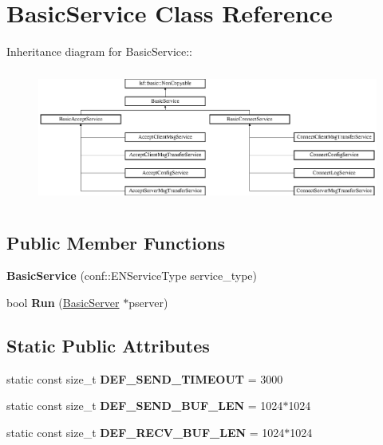 \hypertarget{classBasicService}{
\section{BasicService Class Reference}
\label{classBasicService}
}
Inheritance diagram for BasicService::\begin{figure}[H]
\begin{center}
\leavevmode
\includegraphics[height=4.41441cm]{classBasicService}
\end{center}
\end{figure}
\subsection*{Public Member Functions}
\begin{DoxyCompactItemize}
\item 
\hypertarget{classBasicService_aa4fdda73ce0c6d556456e02d8ed246ae}{
{\bfseries BasicService} (conf::ENServiceType service\_\-type)}
\label{classBasicService_aa4fdda73ce0c6d556456e02d8ed246ae}

\item 
\hypertarget{classBasicService_abcf9a9ffffb3ecfff2c16258cfde2d2f}{
bool {\bfseries Run} (\hyperlink{classBasicServer}{BasicServer} $\ast$pserver)}
\label{classBasicService_abcf9a9ffffb3ecfff2c16258cfde2d2f}

\end{DoxyCompactItemize}
\subsection*{Static Public Attributes}
\begin{DoxyCompactItemize}
\item 
\hypertarget{classBasicService_a326a83d56153486a35586cbd41602242}{
static const size\_\-t {\bfseries DEF\_\-SEND\_\-TIMEOUT} = 3000}
\label{classBasicService_a326a83d56153486a35586cbd41602242}

\item 
\hypertarget{classBasicService_a18bccf5b274e65fd9ce826a6e159fac9}{
static const size\_\-t {\bfseries DEF\_\-SEND\_\-BUF\_\-LEN} = 1024$\ast$1024}
\label{classBasicService_a18bccf5b274e65fd9ce826a6e159fac9}

\item 
\hypertarget{classBasicService_a9a44d874dc31c59ad08380c2e60222bf}{
static const size\_\-t {\bfseries DEF\_\-RECV\_\-BUF\_\-LEN} = 1024$\ast$1024}
\label{classBasicService_a9a44d874dc31c59ad08380c2e60222bf}

\end{DoxyCompactItemize}

